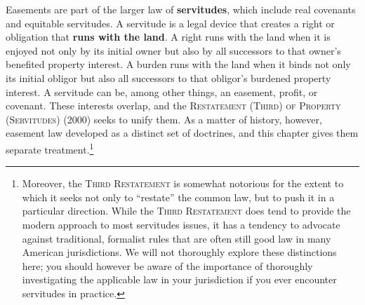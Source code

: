 Easements are part of the larger law of \textbf{servitudes}, which include real
covenants and equitable servitudes.  A servitude is a legal device that creates
a right or obligation that \textbf{runs with the land}. A right runs with the
land when it is enjoyed not only by its initial owner but also by all successors
to that owner's benefited property interest. A burden runs with the land when it
binds not only its initial obligor but also all successors to that obligor's
burdened property interest. A servitude can be, among other things, an easement,
profit, or covenant. These interests overlap, and the \textsc{Restatement
(Third) of Property (Servitudes)} (2000) seeks to unify them.
 As a matter of
history, however, easement law
developed as a distinct set of doctrines, and this chapter gives them separate
treatment.\footnote{Moreover, the \textsc{Third Restatement} is somewhat
notorious for
the extent to which it seeks not only to ``restate'' the common law, but to push
it in a particular direction. While the \textsc{Third Restatement} does tend to
provide
the modern approach to most servitudes issues, it has a tendency to advocate
against traditional, formalist rules that are often still good law in many
American jurisdictions. We will not thoroughly explore these distinctions here;
you should however be aware of the importance of thoroughly investigating the
applicable law in your jurisdiction if you ever encounter servitudes in
practice.} 


